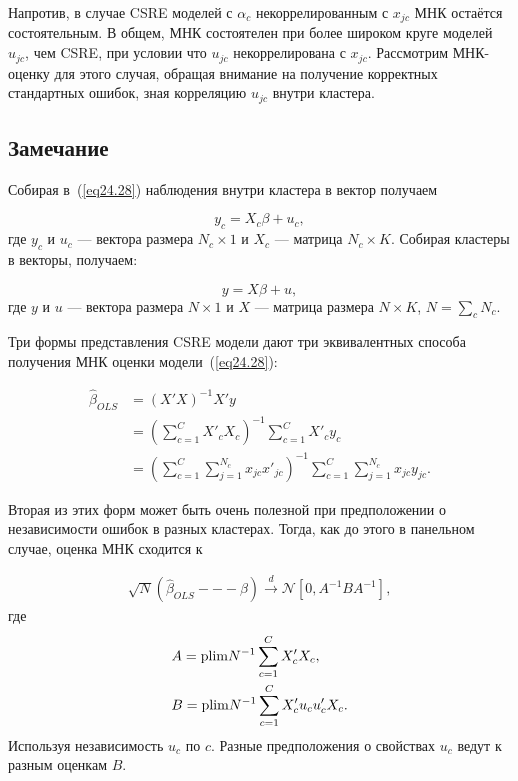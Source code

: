 Напротив, в случае CSRE моделей с $\alpha_c$ некоррелированным с $x_{jc}$ МНК остаётся состоятельным. В общем, МНК состоятелен при более широком круге моделей $u_{jc}$, чем CSRE, при условии что $u_{jc}$ некоррелирована с $x_{jc}$. Рассмотрим МНК-оценку для этого случая, обращая внимание на получение корректных стандартных ошибок, зная корреляцию $u_{jc}$ внутри кластера. 

\subsection*{Замечание}

Собирая в~(\ref{eq24.28})  наблюдения внутри кластера в вектор получаем

\begin{equation}
\label{eq24.29}
y_{c} = X_{c} \beta + u_{c},
\end{equation}
где $y_c$ и $u_c$ --- вектора размера $N_c \times 1$ и $X_c$ --- матрица $N_c \times K$. Собирая кластеры в векторы, получаем:

\begin{equation}
\label{eq24.30}
y = X \beta + u,
\end{equation}
где $y$ и $u$ --- вектора размера $N \times 1$ и $X$ --- матрица размера $N \times K$, $N = \sum_c N_c$. 

Три формы представления CSRE модели дают три эквивалентных способа получения МНК оценки модели~(\ref{eq24.28}):

\begin{align}
\label{eq24.31}
 \hat{\beta}_{OLS} &= (X'X)^{-1}X'y \\
&=\left( \sum_{c=1}^C X'_cX_c \right)^{-1}  \sum_{c=1}^C X'_c y_c  \nonumber \\
&=\left( \sum_{c=1}^C \sum_{j=1}^{N_c} x_{jc} x'_{jc} \right)^{-1} \sum_{c=1}^C \sum_{j=1}^{N_c} x_{jc} y_{jc}. \nonumber
\end{align}

Вторая из этих форм может быть очень полезной при предположении о независимости ошибок в разных кластерах. Тогда, как до этого в панельном случае, оценка МНК сходится к

\begin{align}
\label{eq24.32}
\sqrt{N} (\hat{\beta}_{OLS} --- \beta) \overset{d}{\to}  \mathcal N [0, A^{-1} B A^{-1}], 
\end{align}
где
\begin{align}
\label{eq24.33}
& A = \mathrm{plim } N^{-1} \sum_{c=1}^C X'_c X_c, \\
& B = \mathrm{plim } N^{-1} \sum_{c=1}^C X'_c u_c u'_c X_c. \nonumber
\end{align}
Используя независимость $u_c$ по $c$. Разные предположения о свойствах $u_c$ ведут к разным оценкам $B$. 

